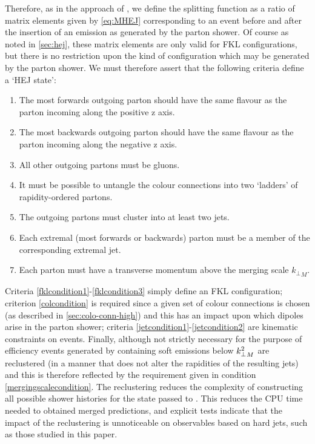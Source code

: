 Therefore, as in the approach of \cite{Andersen:2011zd}, we define the \HEJ splitting function as a ratio of \HEJ matrix elements given by \cref{eq:MHEJ} corresponding to 
an event before and after the insertion of an emission as generated by the parton shower. Of course as noted in \cref{sec:hej}, 
these matrix elements are only valid for FKL configurations, but there is no restriction upon the kind of configuration which may be generated by the parton shower. 
We must therefore assert that the following criteria define a `HEJ state':
\begin{enumerate}\itemsep -0.5mm
 \item The most forwards outgoing parton should have the same flavour as the parton incoming along the positive z axis.\label{fklcondition1}
 \item The most backwards outgoing parton should have the same flavour as the parton incoming along the negative z axis. \label{fklcondition2}
 \item All other outgoing partons must be gluons. \label{fklcondition3}
 \item It must be possible to untangle the colour connections into two `ladders' of rapidity-ordered partons.\label{colcondition}
 \item The outgoing partons must cluster into at least two jets. \label{jetcondition1}
 \item Each extremal (most forwards or backwards) parton must be a member of the corresponding extremal jet.\label{jetcondition2}
 \item Each parton must have a transverse momentum above the merging scale ${k_\perp}_M$. \label{mergingscalecondition}
\end{enumerate}
Criteria \ref{fklcondition1}-\ref{fklcondition3} simply define an FKL
configuration; criterion \ref{colcondition} is required since a given
set of colour connections is chosen (as described in
\cref{sec:colo-conn-high}) and this has an impact upon which dipoles
arise in the \pyt parton shower; criteria
\ref{jetcondition1}-\ref{jetcondition2} are kinematic constraints on
\HEJ events.  Finally, although not strictly necessary for the purpose
of efficiency events generated by \HEJ containing soft emissions below
${k^2_\perp}_{M}$ are reclustered (in a manner that does not alter the
rapidities of the resulting jets) and this is therefore reflected by
the requirement given in condition \ref{mergingscalecondition}.  The
reclustering reduces the complexity of constructing all possible
shower histories for the state passed to \pyt. This reduces the CPU
time needed to obtained merged predictions, and explicit tests
indicate that the impact of the reclustering is unnoticeable on
observables based on hard jets, such as those studied in this paper.

